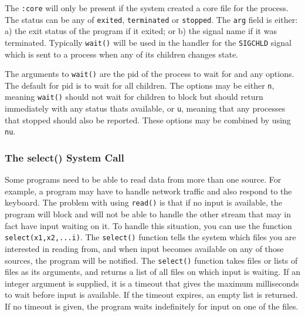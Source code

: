 The \texttt{{\textquotedbl}:core{\textquotedbl}} will only be present if
the system created a core file for the process. The status can be any
of \texttt{{\textquotedbl}exited{\textquotedbl}},
\texttt{{\textquotedbl}terminated{\textquotedbl}} or
\texttt{{\textquotedbl}stopped{\textquotedbl}}. The \texttt{arg} field
is either: a) the exit status of the program if it exited; or b) the
signal name if it was terminated. Typically \texttt{wait()} will be
used in the handler for the \texttt{SIGCHLD} signal which is sent to a
process when any of its children changes state.

The arguments to \texttt{wait()} are the pid of the process to wait for
and any options. The default for pid is to wait for all children. The
options may be either \texttt{{\textquotedbl}n{\textquotedbl}}, meaning
\texttt{wait()} should not wait for children to block but should return
immediately with any status that{\textquotesingle}s available, or
\texttt{{\textquotedbl}u{\textquotedbl}}, meaning that any processes
that stopped should also be reported. These options may be combined by
using \texttt{{\textquotedbl}nu{\textquotedbl}}.

\subsubsection[The select() System Call]{The select() System Call}
Some programs need to be able to read data from more than one source.
For example, a program may have to handle network traffic and also
respond to the keyboard. The problem with using
\texttt{read()} is that if no input is available, the program will
block and will not be able to handle the other stream that may in fact
have input waiting on it. To handle this situation, you can use the
function \texttt{select(x1,x2,...i)}. The
\texttt{select()} function tells the system which files
you are interested in reading from, and when input becomes available on
any of those sources, the program will be notified. The
\texttt{select()} function takes files or lists of files as its
arguments, and returns a list of all files on which input is waiting.
If an integer argument is supplied, it is a timeout that gives the
maximum milliseconds to wait before input is available. If the timeout
expires, an empty list is returned. If no timeout is given, the program
waits indefinitely for input on one of the files.


